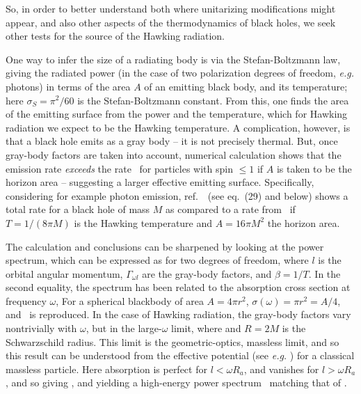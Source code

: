So, in order to better understand both where unitarizing modifications might appear, and also other aspects of the thermodynamics of black holes, we seek other tests for the source of the Hawking radiation.   

One way to infer the size of a radiating body is via the Stefan-Boltzmann law, giving the radiated power (in the case of two polarization degrees of freedom, {\it e.g.} photons)
%
\eqn{}
%
in terms of the area $A$ of an emitting black body, and its temperature; here $\sigma_{S}=\pi^2/60$ is the Stefan-Boltzmann constant.  From this, one finds the area of the emitting surface from the power and the temperature, which for Hawking radiation we expect to be the Hawking temperature.  
A complication, however, is that a black hole emits as a gray body -- it is not precisely thermal.  But, once gray-body factors are taken into account, numerical calculation  shows that the emission rate {\it exceeds} the rate \SB\ for particles with spin $\leq1$ if $A$ is taken to be the horizon area -- suggesting a larger effective emitting surface.  Specifically, considering for example photon emission, ref.~\Page\ (see eq.~(29) and below) shows a total rate for a black hole of mass $M$
%
\eqn{}
%
 as compared to a rate 
 \eqn{}
 from \SB\ if $T=1/(8\pi M)$ is the Hawking temperature and $A=16\pi M^2$ the horizon area.

The calculation and conclusions can be sharpened by looking at the power spectrum, which can be expressed as
%
\eqn{}
%
for two degrees of freedom, where $l$ is the orbital angular momentum, $\Gamma_{\omega l}$ are the gray-body factors, and $\beta=1/T$.  In the second equality, the spectrum has been related to the absorption cross section at frequency $\omega$,
%
\eqn{}
%
For a spherical blackbody of area $A=4\pi r^2$, $\sigma(\omega)=\pi r^2 = A/4$, and \SB\ is reproduced.  In the case of Hawking radiation, the gray-body factors vary nontrivially with $\omega$, but in the large-$\omega$ limit, 
%
\eqn{}
%
where
%
\eqn{}
%
and $R=2M$ is the Schwarzschild radius.
This limit is the geometric-optics, massless limit, and so this result can be understood from the effective potential (see {\it e.g.} ) for a classical massless particle.  Here absorption is perfect for $l<\omega R_a$, and vanishes for $l>\omega R_a$, and so
%
\eqn{}
%
giving \HEsigma, and yielding a high-energy power spectrum \pspec\ matching that of \Page.

